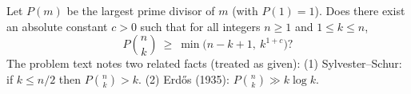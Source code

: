 Let $P(m)$ be the largest prime divisor of $m$ (with $P(1)=1$).
Does there exist an absolute constant $c>0$ such that for all integers $n\ge1$ and $1\le k\le n$,
\[
P\!\binom{n}{k}\ \ge\ \min\bigl(n-k+1,\ k^{1+c}\bigr)?
\]
The problem text notes two related facts (treated as given):
(1) Sylvester--Schur: if $k\le n/2$ then $P\!\binom{n}{k}>k$.
(2) Erd\H{o}s (1935): $P\!\binom{n}{k} \gg k\log k$.
